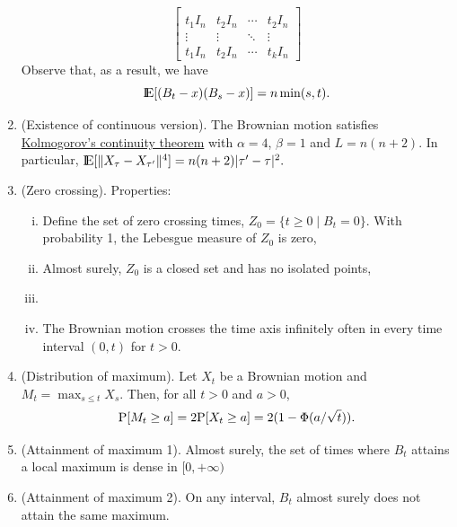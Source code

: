 \documentclass[a4paper,10pt]{scrbook}
\begin{document}
\begin{enumerate}
\[\begin{bmatrix}
                                 \\
                                 t_1 I_n & t_2 I_n & \cdots & t_2 I_n
                                 \\
                                 \vdots & \vdots & \ddots & \vdots
                                 \\
                                 t_1 I_n & t_2 I_n & \cdots & t_k I_n 
                                \end{bmatrix}
        \]
	Observe that, as a result, we have
	\[
	 \E[(B_t - x)(B_s - x)] = n \min(s,t).
	\]
 \item (Existence of continuous version). 
       The Brownian motion satisfies 
       \hyperlink{link:kolmogorov_continuity_thm}{Kolmogorov's continuity theorem} 
       with \(\alpha = 4\), \(\beta = 1\) and \(L = n(n+2)\). In particular, 
       \(
	      \E[\|X_{\tau} - X_{\tau'}\|^4] 
	{}={} 
	      n(n+2) |\tau' - \tau|^2.
	\)
 \item (Zero crossing). 
       Properties:
       \begin{enumerate}[i.]
        \item Define the set of zero crossing times, $Z_0 = \{t\geq 0 \mid B_t = 0\}$.
              With probability 1, the Lebesgue measure of $Z_0$ is zero,
        \item Almost surely, $Z_0$ is a closed set and has no isolated points,              
        \item 
        \item The Brownian motion crosses the time axis infinitely often in every time interval
              \((0, t)\) for \(t>0\).
       
       \end{enumerate}

       
       
 \item (Distribution of maximum). Let \(X_t\) be a Brownian motion and \(M_t = \max_{s \leq t} X_s\).
       Then, for all \(t>0\) and \(a>0\),
       \[
        \mathrm{P}[M_t \geq a] = 2\mathrm{P}[X_t \geq a] = 2(1-\Phi(a/\sqrt{t})).
       \]
 
 \item (Attainment of maximum 1). Almost surely, the set of times where $B_t$ attains a local maximum 
       is dense in $[0, +\infty)$
       
 \item (Attainment of maximum 2). On any interval, $B_t$ almost surely does not attain the same 
       maximum.
       

\end{enumerate}
\end{document}
